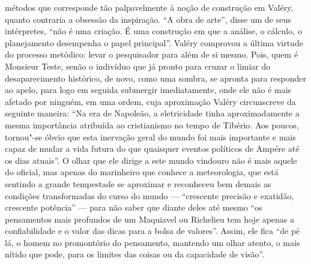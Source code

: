 métodos que corresponde tão palpavelmente à noção de construção em
Valéry, quanto contraria a obsessão da inspiração. ``A obra de arte'',
disse um de seus intérpretes, ``não é uma criação. É uma construção em
que a análise, o cálculo, o planejamento desempenha o papel principal''.
Valéry comprovou a última virtude do processo metódico: levar o
pesquisador para além de si mesmo. Pois, quem é Monsieur Teste, senão o
indivíduo que já pronto para cruzar o limiar do desaparecimento
histórico, de novo, como uma sombra, se apronta para responder ao apelo,
para logo em seguida submergir imediatamente, onde ele não é mais
afetado por ninguém, em uma ordem, cuja aproximação Valéry circunscreve
da seguinte maneira: ``Na era de Napoleão, a eletricidade tinha
aproximadamente a mesma importância atribuída ao cristianismo no tempo
de Tibério. Aos poucos, tornou"-se óbvio que esta inervação geral do
mundo foi mais importante e mais capaz de mudar a vida futura do que
quaisquer eventos políticos de Ampére até os dias atuais''. O olhar que
ele dirige a este mundo vindouro não é mais aquele do oficial, mas
apenas do marinheiro que conhece a meteorologia, que está sentindo a
grande tempestade se aproximar e reconheceu bem demais as condições
transformadas do curso do mundo --- ``crescente precisão e exatidão,
crescente potência'' --- para não saber que diante deles até mesmo ``os
pensamentos mais profundos de um Maquiavel ou Richelieu tem hoje apenas
a confiabilidade e o valor das dicas para a bolsa de valores''. Assim,
ele fica ``de pé lá, o homem no promontório do pensamento, mantendo um
olhar atento, o mais nítido que pode, para os limites das coisas ou da
capacidade de visão''.
